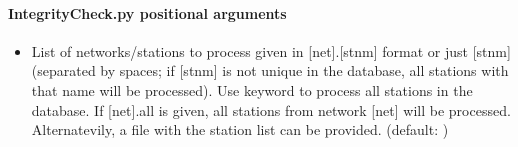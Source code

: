 \documentclass[letterpaper,10pt,english]{sphinxmanual}
\begin{document}
\paragraph{IntegrityCheck.py positional arguments}
\label{\detokenize{com:IntegrityCheck.py-positional-arguments}}\begin{itemize}
\item {} 
\sphinxAtStartPar
{\hyperref[\detokenize{com:IntegrityCheck.py-all|net.stnm}]{}} \sphinxhyphen{} List of networks/stations to process given in {[}net{]}.{[}stnm{]} format or just {[}stnm{]} (separated by spaces; if {[}stnm{]} is not unique in the database, all stations with that name will be processed). Use keyword  to process all stations in the database. If {[}net{]}.all is given, all stations from network {[}net{]} will be processed. Alternatevily, a file with the station list can be provided. (default: )

\end{itemize}
\end{document}
